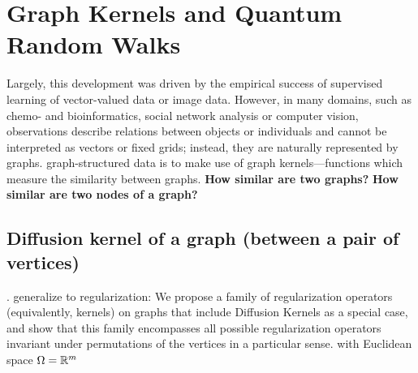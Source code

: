 \section{Graph Kernels and Quantum Random Walks}
Largely, this development was driven by the empirical success of supervised learning of vector-valued data or image data. However, in many domains, such as chemo- and bioinformatics, social network analysis or computer vision, observations describe relations between objects or individuals and cannot be interpreted as vectors or fixed grids; instead, they are naturally represented by graphs.
\cite{kriegeSurveyGraphKernels2020}
graph-structured data is to make use of graph kernels—functions which measure the similarity between graphs.
\textbf{How similar are two graphs?}
\textbf{How similar are two nodes of a graph?}

\subsection{Diffusion kernel of a graph (between a pair of vertices)}
\cite{kondorDiffusionKernelsGraphs2002}.
generalize to regularization: 
We propose a family of regularization operators (equivalently, kernels) on graphs that include Diffusion Kernels as a special case, and show that this family encompasses all possible regularization operators invariant under permutations of the vertices in a particular sense.
\cite{smolaKernelsRegularizationGraphs2003}
with Euclidean space $\Omega = \mathbb{R}^m$

